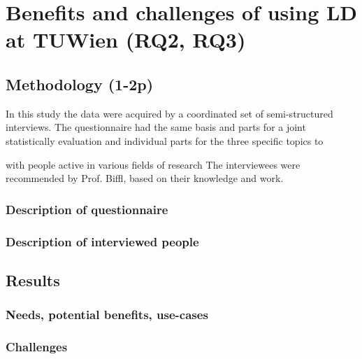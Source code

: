 \chapter{Benefits and challenges of using LD at TUWien (RQ2, RQ3)}
\section{Methodology (1-2p)}
In this study the data were acquired by a coordinated set of semi-structured interviews. The questionnaire had the same basis and parts for a joint statistically evaluation and individual parts for the three specific topics to 


with people active in various fields of research
The interviewees were recommended by Prof. Biffl, based on their knowledge and work. 
\subsection{Description of questionnaire }
\subsection{Description of interviewed people}
\section{Results}
\subsection{Needs, potential benefits, use-cases}
\subsection{Challenges}